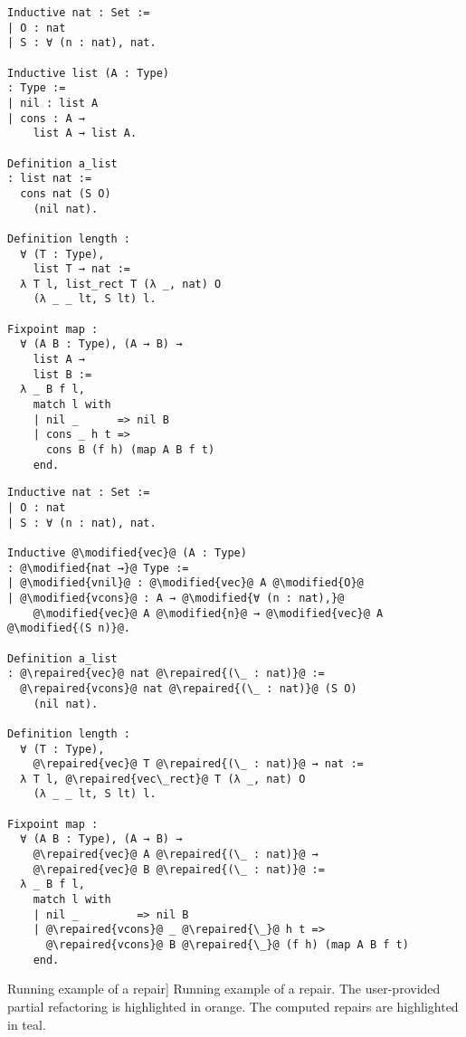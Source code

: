 \begin{figure*}[!htp]

  \noindent%
  \begin{minipage}[t]{0.50\textwidth}
    \begin{verbatim}
Inductive nat : Set :=
| O : nat
| S : ∀ (n : nat), nat.

Inductive list (A : Type)
: Type :=
| nil : list A
| cons : A →
    list A → list A.

Definition a_list
: list nat :=
  cons nat (S O)
    (nil nat).

Definition length :
  ∀ (T : Type),
    list T → nat :=
  λ T l, list_rect T (λ _, nat) O
    (λ _ _ lt, S lt) l.

Fixpoint map :
  ∀ (A B : Type), (A → B) →
    list A →
    list B :=
  λ _ B f l,
    match l with
    | nil _      => nil B
    | cons _ h t =>
      cons B (f h) (map A B f t)
    end.
  \end{verbatim}
\end{minipage}%
\begin{minipage}[t]{0.50\textwidth}
  \begin{verbatim}
Inductive nat : Set :=
| O : nat
| S : ∀ (n : nat), nat.

Inductive @\modified{vec}@ (A : Type)
: @\modified{nat →}@ Type :=
| @\modified{vnil}@ : @\modified{vec}@ A @\modified{O}@
| @\modified{vcons}@ : A → @\modified{∀ (n : nat),}@
    @\modified{vec}@ A @\modified{n}@ → @\modified{vec}@ A @\modified{(S n)}@.

Definition a_list
: @\repaired{vec}@ nat @\repaired{(\_ : nat)}@ :=
  @\repaired{vcons}@ nat @\repaired{(\_ : nat)}@ (S O)
    (nil nat).

Definition length :
  ∀ (T : Type),
    @\repaired{vec}@ T @\repaired{(\_ : nat)}@ → nat :=
  λ T l, @\repaired{vec\_rect}@ T (λ _, nat) O
    (λ _ _ lt, S lt) l.

Fixpoint map :
  ∀ (A B : Type), (A → B) →
    @\repaired{vec}@ A @\repaired{(\_ : nat)}@ →
    @\repaired{vec}@ B @\repaired{(\_ : nat)}@ :=
  λ _ B f l,
    match l with
    | nil _         => nil B
    | @\repaired{vcons}@ _ @\repaired{\_}@ h t =>
      @\repaired{vcons}@ B @\repaired{\_}@ (f h) (map A B f t)
    end.
  \end{verbatim}
\end{minipage}

\caption%
[Running example of a \Chick{} repair]
{Running example of a \Chick{} repair.  The user-provided partial refactoring is highlighted in orange.  The computed repairs are highlighted in teal.}~\label{listtovec}

\end{figure*}

